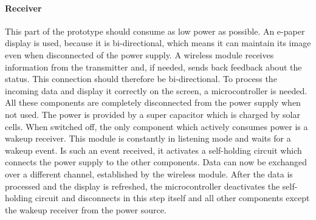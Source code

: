 \paragraph{Receiver}
This part of the prototype should consume as low power as possible.
An e-paper display is used, because it is bi-directional, which means it can maintain its image even when disconnected of the power supply.
A wireless module receives information from the transmitter and, if needed, sends back feedback about the status.
This connection should therefore be bi-directional.
To process the incoming data and display it correctly on the screen, a microcontroller is needed.
All these components are completely disconnected from the power supply when not used.
The power is provided by a super capacitor which is charged by solar cells.
When switched off, the only component which actively consumes power is a wakeup receiver.
This module is constantly in listening mode and waits for a wakeup event.
Is such an event received, it activates a self-holding circuit which connects the power supply to the other components.
Data can now be exchanged over a different channel, established by the wireless module.
After the data is processed and the display is refreshed, the microcontroller deactivates the self-holding circuit and disconnects in this step itself and all other components except the wakeup receiver from the power source. 